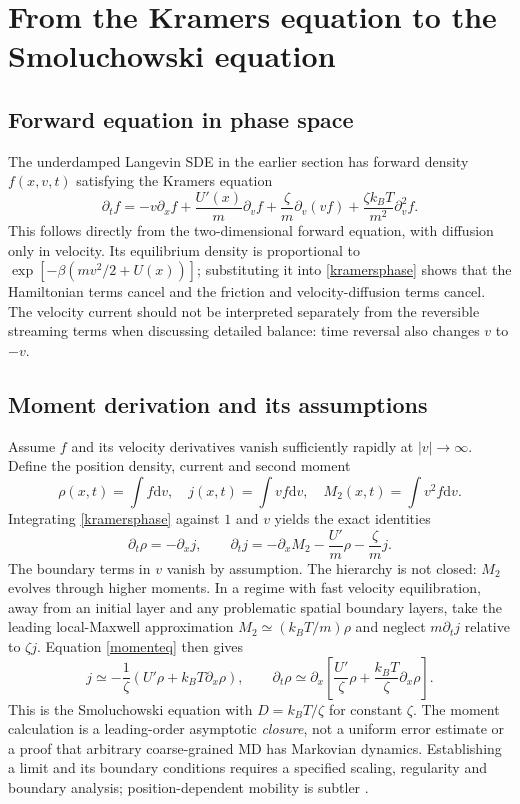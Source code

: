 \documentclass[11pt,a4paper]{article}
\newcommand{\dd}{\mathrm d}
\theoremstyle{remark}\newtheorem*{remark}{Physical interpretation}
\begin{document}
\section{From the Kramers equation to the Smoluchowski equation}
\subsection{Forward equation in phase space}
The underdamped Langevin SDE in the earlier section has forward density $f(x,v,t)$ satisfying the Kramers equation
\begin{equation}\label{kramersphase}
\partial_t f=-v\partial_x f+\frac{U'(x)}{m}\partial_v f+\frac{\zeta}{m}\partial_v(vf)+\frac{\zeta k_BT}{m^2}\partial_v^2 f.
\end{equation}
This follows directly from the two-dimensional forward equation, with diffusion only in velocity. Its equilibrium density is proportional to $\exp[-\beta(mv^2/2+U(x))]$; substituting it into \eqref{kramersphase} shows that the Hamiltonian terms cancel and the friction and velocity-diffusion terms cancel. The velocity current should not be interpreted separately from the reversible streaming terms when discussing detailed balance: time reversal also changes $v$ to $-v$.

\subsection{Moment derivation and its assumptions}
Assume $f$ and its velocity derivatives vanish sufficiently rapidly at $|v|\to\infty$. Define the position density, current and second moment
\begin{equation}
\rho(x,t)=\int f\dd v,\quad j(x,t)=\int v f\dd v,\quad M_2(x,t)=\int v^2 f\dd v.
\end{equation}
Integrating \eqref{kramersphase} against $1$ and $v$ yields the exact identities
\begin{equation}\label{momenteq}
\partial_t\rho=-\partial_xj,\qquad
\partial_tj=-\partial_xM_2-\frac{U'}m\rho-\frac\zeta m j.
\end{equation}
The boundary terms in $v$ vanish by assumption. The hierarchy is not closed: $M_2$ evolves through higher moments. In a regime with fast velocity equilibration, away from an initial layer and any problematic spatial boundary layers, take the leading local-Maxwell approximation $M_2\simeq(k_BT/m)\rho$ and neglect $m\partial_tj$ relative to $\zeta j$. Equation \eqref{momenteq} then gives
\begin{equation}
j\simeq-\frac{1}{\zeta}\left(U'\rho+k_BT\partial_x\rho\right),\qquad
\partial_t\rho\simeq\partial_x\left[\frac{U'}{\zeta}\rho+\frac{k_BT}{\zeta}\partial_x\rho\right].
\end{equation}
This is the Smoluchowski equation with $D=k_BT/\zeta$ for constant $\zeta$. The moment calculation is a leading-order asymptotic \emph{closure}, not a uniform error estimate or a proof that arbitrary coarse-grained MD has Markovian dynamics. Establishing a limit and its boundary conditions requires a specified scaling, regularity and boundary analysis; position-dependent mobility is subtler \cite{risken,gardiner}.
\end{document}
